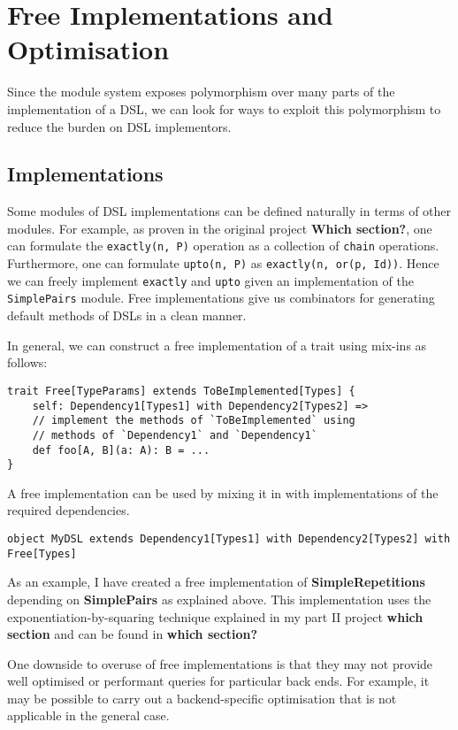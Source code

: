 \documentclass{report}
\newcommand \2[0]{\textbf{2}}
\newcommand \3[0]{\textbf{3}}
\newcommand{\todo}[1]{\textbf{#1}}
\begin{document}
\chapter{Free Implementations and Optimisation}
Since the module system exposes polymorphism over many parts of the implementation of a DSL, we can look for ways to exploit this polymorphism to reduce the burden on DSL implementors.

\section{Implementations}
Some modules of DSL implementations can be defined naturally in terms of other modules. For example, as proven in the original project \todo{Which section?}, one can formulate the \texttt{exactly(n, P)} operation as a collection of \texttt{chain} operations. Furthermore, one can formulate \texttt{upto(n, P)} as \texttt{exactly(n, or(p, Id))}. Hence we can freely implement \texttt{exactly} and \texttt{upto} given an implementation of the \texttt{SimplePairs} module. Free implementations give us combinators for generating default methods of DSLs in a clean manner.

In general, we can construct a free implementation of a trait using mix-ins as follows:

\begin{verbatim}
trait Free[TypeParams] extends ToBeImplemented[Types] {
    self: Dependency1[Types1] with Dependency2[Types2] =>
    // implement the methods of `ToBeImplemented` using 
    // methods of `Dependency1` and `Dependency1`
    def foo[A, B](a: A): B = ...
}
\end{verbatim}

A free implementation can be used by mixing it in with implementations of the required dependencies.

\begin{verbatim}
object MyDSL extends Dependency1[Types1] with Dependency2[Types2] with Free[Types]
\end{verbatim}

As an example, I have created a free implementation of \todo{SimpleRepetitions} depending on \todo{SimplePairs} as explained above. This  implementation uses the exponentiation-by-squaring technique explained in my part II project \todo{which section} and can be found in \todo{which section?}

One downside to overuse of free implementations is that they may not provide well optimised or performant queries for particular back ends. For example, it may be possible to carry out a backend-specific optimisation that is not applicable in the general case.
\end{document}
